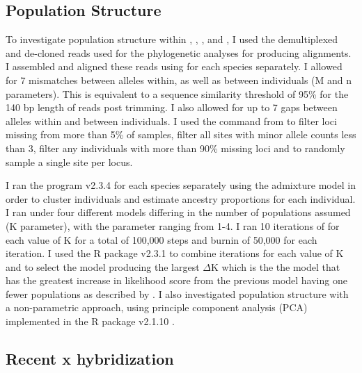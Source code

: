 

\subsection{Population Structure}
To investigate population structure within \amer, \fowl, \terr, and \wood , I used the demultiplexed
and de-cloned reads used for the phylogenetic analyses for producing alignments. 
I assembled and aligned these reads using \stacks for each species separately.
I allowed for 7 mismatches between alleles within, as well as between individuals
(M and n parameters). This is equivalent to a sequence similarity threshold of   
95\% for the 140 bp length of reads post trimming. 
I also allowed for up to 7 gaps between alleles within and between individuals.
I used the \populations command from \stacks to filter loci missing from more than
5\% of samples, filter all sites with minor allele counts less than 3, filter 
any individuals with more than 90\% missing loci and to randomly sample a single
site per locus.

I ran the program \structure v2.3.4 \parencite{pritchard2000} for each species  
separately using the admixture model in order to cluster individuals and estimate
ancestry proportions for each individual. 
I ran \structure under four different models differing in the number of 
populations assumed (K parameter), with the parameter ranging from 1-4.
I ran 10 iterations of \structure for each value of K for a total of 100,000
steps and burnin of 50,000 for each iteration.
I used the R package \pophelper v2.3.1 \parencite{francis2017} to combine
iterations for each value of K and to select the model producing the largest
$\Delta$K which is the the model that has the greatest increase in likelihood 
score from the previous model having one fewer populations as described by \parencite{evanno2005}.
I also investigated population structure with a non-parametric approach, using
principle component analysis (PCA) implemented in the R package \adegenet
\adegenet v2.1.10 \parencite{jombart2008}. 

\subsection{Recent \fowl x \wood hybridization}

